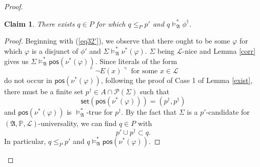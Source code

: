 \documentclass[12pt, twoside]{memoir}
\numberwithin{equation}{section}
\newtheorem{claim2}[thm]{Claim}
\theoremstyle{definition}
\theoremstyle{remark}
\theoremstyle{definition}
\theoremstyle{definition}
\theoremstyle{definition}
\theoremstyle{remark}
\begin{document}
\begin{proof}
\begin{enumerate}[label=Case \arabic*:, leftmargin=50pt]
    \begin{claim2}\label{claim335}
    There exists $q \in P$ for which $q \leq_P p'$ and $q \models^{*}_{\mathfrak{A}} \phi^{\dagger}$.
    \end{claim2}

    \begin{proof}
    Beginning with (\ref{eq32'}), we observe that there ought to be some $\varphi$ for which $\varphi$ is a disjunct of $\phi'$ and $\Sigma \models^{*}_{\mathfrak{A}} \nu^*(\varphi)$. $\Sigma$ being $\mathcal{L}$-nice and Lemma \ref{corr} gives us $\Sigma \models^{*}_{\mathfrak{A}} \mathsf{pos}(\nu^*(\varphi))$. 
    Since literals of the form $$\ulcorner \neg E(x) \urcorner \text{ for some } x \in \mathcal{L}$$ do not occur in $\mathsf{pos}(\nu^*(\varphi))$, following the proof of Case 1 of Lemma \ref{exist}, there must be a finite set $p^{\dagger} \in A \cap \mathcal{P}(\Sigma)$ such that $$\mathsf{set}(\mathsf{pos}(\nu^*(\varphi))) = (p^{\dagger}, p^{\dagger})$$ and $\mathsf{pos}(\nu^*(\varphi))$ is $\models^{*}_{\mathfrak{A}}$-true for $p^{\dagger}$. By the fact that $\Sigma$ is a $p'$-candidate for $(\mathfrak{A}, \mathbb{P}, \mathcal{L})$-universality, we can find $q \in P$ with $$p' \cup p^{\dagger} \subset q.$$ In particular, $q \leq_P p'$ and $q \models^{*}_{\mathfrak{A}} \mathsf{pos}(\nu^*(\varphi))$.
    

\end{proof}
\end{enumerate}
\end{proof}
\end{document}
